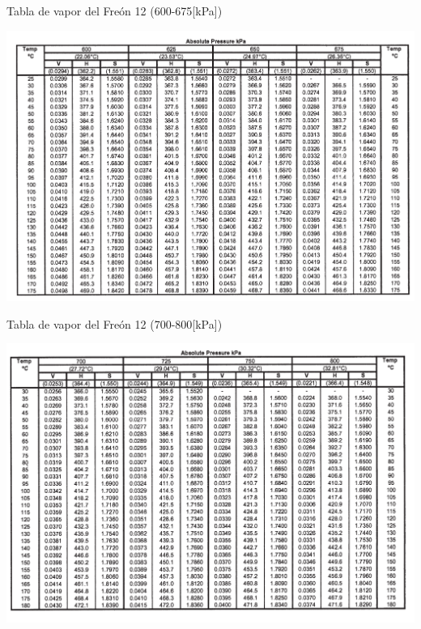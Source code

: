\documentclass[11pt,letterpaper]{extarticle}        %
\numberwithin{equation}{section}                    %
\begin{document}
\begin{table}[H]
\centering
\caption[Tabla de vapor del Freón 12 (600-675{[}kPa{]})]{Tabla de vapor del Freón 12 (600-675{[}kPa{]})\cite{b:Tabla}}
\label{t:Freon12-700-1}
\includegraphics[width=0.85\linewidth]{TV-R12-700-1}
\end{table}

\begin{table}[H]
\centering
\caption[Tabla de vapor del Freón 12 (700-800{[}kPa{]})]{Tabla de vapor del Freón 12 (700-800[kPa])\cite{b:Tabla}}
\label{t:Freon12-700-2}
\includegraphics[width=\linewidth]{TV-R12-700-2}
\end{table}
\end{document}
